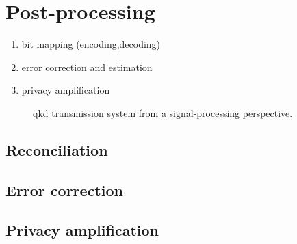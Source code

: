 \section{Post-processing}

\begin{enumerate}
	\item bit mapping (encoding,decoding)
	\item error correction and estimation
	\item privacy amplification
\end{enumerate}




\begin{figure}[htb]
	\centering
	
	\caption{\Gls{qkd} transmission system from a signal-processing perspective.}
\end{figure}

\cite{Silberhorn2002} %
\cite{Fung2010} %

\subsection{Reconciliation}
\cite{Leverrier2008} %
\cite{Elkouss2011} %

\subsection{Error correction}


\subsection{Privacy amplification}


\cite{Bennett1995} %